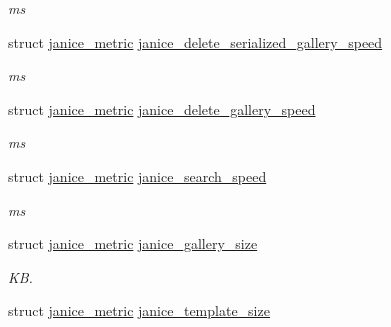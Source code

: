 \begin{DoxyCompactItemize}
\begin{DoxyCompactList}\small\item\em ms \end{DoxyCompactList}\item 
\hypertarget{structjanice__metrics_a1f01aee7e35a562624942a69467228a9}{}struct \hyperlink{structjanice__metric}{janice\+\_\+metric} \hyperlink{structjanice__metrics_a1f01aee7e35a562624942a69467228a9}{janice\+\_\+delete\+\_\+serialized\+\_\+gallery\+\_\+speed}\label{structjanice__metrics_a1f01aee7e35a562624942a69467228a9}

\begin{DoxyCompactList}\small\item\em ms \end{DoxyCompactList}\item 
\hypertarget{structjanice__metrics_a3d0a37dd1a547d36d88e4b7569bc58c6}{}struct \hyperlink{structjanice__metric}{janice\+\_\+metric} \hyperlink{structjanice__metrics_a3d0a37dd1a547d36d88e4b7569bc58c6}{janice\+\_\+delete\+\_\+gallery\+\_\+speed}\label{structjanice__metrics_a3d0a37dd1a547d36d88e4b7569bc58c6}

\begin{DoxyCompactList}\small\item\em ms \end{DoxyCompactList}\item 
\hypertarget{structjanice__metrics_a46dc6f2b00a50f0fbab73b16ea62f159}{}struct \hyperlink{structjanice__metric}{janice\+\_\+metric} \hyperlink{structjanice__metrics_a46dc6f2b00a50f0fbab73b16ea62f159}{janice\+\_\+search\+\_\+speed}\label{structjanice__metrics_a46dc6f2b00a50f0fbab73b16ea62f159}

\begin{DoxyCompactList}\small\item\em ms \end{DoxyCompactList}\item 
\hypertarget{structjanice__metrics_ae03aec4e6db971fc5d76fbb572722c0c}{}struct \hyperlink{structjanice__metric}{janice\+\_\+metric} \hyperlink{structjanice__metrics_ae03aec4e6db971fc5d76fbb572722c0c}{janice\+\_\+gallery\+\_\+size}\label{structjanice__metrics_ae03aec4e6db971fc5d76fbb572722c0c}

\begin{DoxyCompactList}\small\item\em K\+B. \end{DoxyCompactList}\item 
\hypertarget{structjanice__metrics_ae81fd05b2227e9a14504336ce5984b10}{}struct \hyperlink{structjanice__metric}{janice\+\_\+metric} \hyperlink{structjanice__metrics_ae81fd05b2227e9a14504336ce5984b10}{janice\+\_\+template\+\_\+size}\label{structjanice__metrics_ae81fd05b2227e9a14504336ce5984b10}


\end{DoxyCompactItemize}
